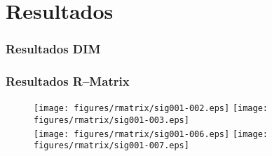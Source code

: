 \documentclass[14pt,compress]{beamer}
\begin{document}
\section{Resultados}
\begin{frame}
\frametitle{Resultados DIM}

\end{frame}
\begin{frame}
\frametitle{Resultados R--Matrix}

\vspace{-0.2cm}
\begin{figure}
\texttt{[image: figures/rmatrix/sig001-002.eps]}
\texttt{[image: figures/rmatrix/sig001-003.eps]} \\
\vspace{0.2cm}
\texttt{[image: figures/rmatrix/sig001-006.eps]} 
\texttt{[image: figures/rmatrix/sig001-007.eps]}
\end{figure}

\end{frame}
\end{document}
